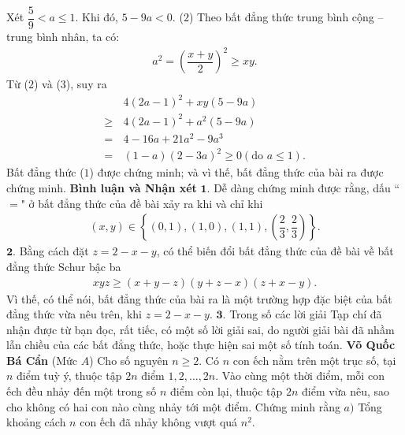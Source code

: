\begin{multicols}{2}
	\vskip 0.05cm
	Xét $\dfrac{5}{9} < a \le 1$.
	\vskip 0.05cm  
	Khi đó, $5 - 9a < 0.$ \hfill ($2$)
	\vskip 0.05cm
	Theo bất đẳng thức trung bình cộng -- trung bình nhân, ta có:
	\begin{align*}
		{a^2} = {\left( {\dfrac{{x + y}}{2}} \right)^2} \ge xy. \tag{$3$}
	\end{align*}
	Từ ($2$) và ($3$), suy ra
	\begin{align*}
			&4{\left( {2a - 1} \right)^2} + xy\left( {5 - 9a} \right) \\[-0.5ex]
			\ge \,&4{\left( {2a - 1} \right)^2} + {a^2}\left( {5 - 9a} \right)\\
		 = \,&4 - 16a + 21{a^2} - 9{a^3}\\[-0.5ex]
		= \,&\left( {1 - a} \right){\left( {2 - 3a} \right)^2} \ge 0\left( {{\text{do }}a \le 1} \right).
	\end{align*}
	Bất đẳng thức ($1$) được chứng minh; và vì thế, bất đẳng thức của bài ra được chứng minh.
	\vskip 0.05cm
	\textbf{\color{thachthuctoanhoc}Bình luận và Nhận xét}
	\vskip 0.05cm
	$\pmb{1.}$ Dễ dàng chứng minh được rằng, dấu ``$=$" ở bất đẳng thức của đề bài xảy ra khi và chỉ khi
	\begin{align*}
		\left( {x,y} \right) \in \left\{ {\left( {0,1} \right),\left( {1,0} \right),\left( {1,1} \right),\left( {\dfrac{2}{3},\dfrac{2}{3}} \right)} \right\}.
	\end{align*}
	$\pmb{2.}$ Bằng cách đặt $z = 2 - x - y$, có thể biến đổi bất đẳng thức của đề bài về bất đẳng thức Schur bậc ba
	\begin{align*}
		xyz \ge \left( {x + y - z} \right)\left( {y + z - x} \right)\left( {z + x - y} \right).
	\end{align*}
	Vì thế, có thể nói, bất đẳng thức của bài ra là một trường hợp đặc biệt của bất đẳng thức vừa nêu trên, khi $z = 2 - x - y$.
	\vskip 0.05cm
	$\pmb{3.}$ Trong số các lời giải Tạp chí đã nhận được từ bạn đọc, rất tiếc, có một số lời giải sai, do người giải bài đã nhầm lẫn chiều của các bất đẳng thức, hoặc thực hiện sai một số tính toán.
	\vskip 0.05cm
	\hfill \textbf{\color{thachthuctoanhoc}Võ Quốc Bá Cẩn}
	\vskip 0.05cm
	{}
	(Mức $A$) Cho số nguyên $n\ge2$. Có $n$ con ếch nằm trên một trục số, tại $n$ điểm tuỳ ý, thuộc tập $2n$ điểm $1,2,\ldots,2n$. Vào cùng một thời điểm, mỗi con ếch đều nhảy đến một trong số $n$ điểm còn lại, thuộc tập $2n$ điểm vừa nêu, sao cho không có hai con nào cùng nhảy tới một điểm. Chứng minh rằng
	\vskip 0.05cm
	$a)$ Tổng khoảng cách $n$ con ếch đã nhảy không vượt quá $n^2$. 

\end{multicols}
